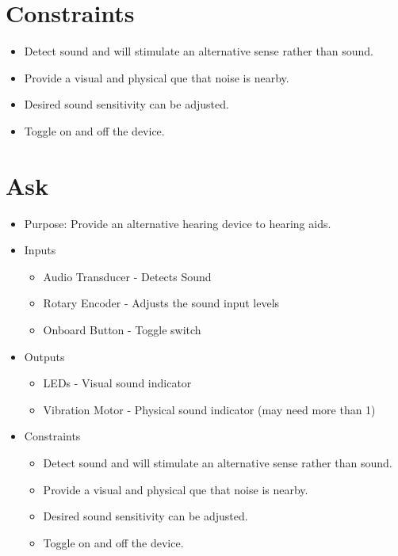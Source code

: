 \documentclass{article}
\begin{document}
\section{Constraints}
\begin{itemize}
    \item Detect sound and will stimulate an alternative sense rather than sound.
    \item Provide a visual and physical que that noise is nearby.
    \item Desired sound sensitivity can be adjusted.
    \item Toggle on and off the device.
  \end{itemize}

\section{Ask}
\begin{itemize}
    \item Purpose:
    \newline
    Provide an alternative hearing device to hearing aids.
    \item Inputs
    \begin{itemize}
        \item Audio Transducer  - Detects Sound
        \item Rotary Encoder - Adjusts the sound input levels
        \item Onboard Button - Toggle switch
    \end{itemize}

    \item Outputs
    \begin{itemize}
        \item LEDs - Visual sound indicator
        \item Vibration Motor - Physical sound indicator (may need more than 1)
    \end{itemize}
    \item Constraints
    \begin{itemize}
      \item Detect sound and will stimulate an alternative sense rather than sound.
      \item Provide a visual and physical que that noise is nearby.
      \item Desired sound sensitivity can be adjusted.
      \item Toggle on and off the device.
    \end{itemize}
  \end{itemize}
\end{document}
